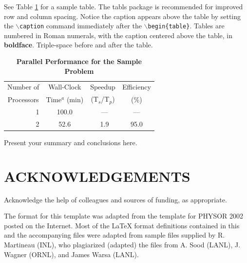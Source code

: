 \documentclass{mc2013}
\begin{document}
See Table \ref{table:example} for a sample table.  The tabls package is
recommended for improved row and column spacing.  Notice the caption appears 
above the table by setting the \texttt{$\backslash$caption} command immediately 
after the \texttt{$\backslash$begin\{table\}}. Tables are numbered in Roman 
numerals, with the caption centered above the table, in {\bf boldface}.  
Triple-space before and after the table.

\vspace{16pt}
\begin{table}[!htb]
\centering
\caption{\bf Parallel Performance for the Sample Problem}
\label{table:example} 
\vspace{14pt}
\begin{tabular}{||r||c|c|c||} \hline \hline
 \multicolumn{1}{||c||}{Number of} &
 \multicolumn{1}{c|}{Wall-Clock} &
 \multicolumn{1}{c|}{Speedup} &
 \multicolumn{1}{c||}{Efficiency} \\
 \multicolumn{1}{||c||}{Processors} &
 \multicolumn{1}{c|}{Time$^{a}$ (min)} &
 \multicolumn{1}{c|}{(T$_{s}$/T$_{p}$)} &
 \multicolumn{1}{c||}{(\%)} \\ \hline\hline
\ 1 &  100.0 & \ ---    & ---  \\ \hline
\ 2 &   52.6 & \ 1.9    & 95.0 \\ \hline \hline
\end{tabular}
\end{table}
\vspace{16pt}



Present your summary and conclusions here.


\section*{ACKNOWLEDGEMENTS}

Acknowledge the help of colleagues and sources of funding, as appropriate.

The format for this template was adapted from the template for PHYSOR 2002 
posted on the Internet.  Most of the {\LaTeX} format definitions contained
in this and the accompanying files were adapted from sample files supplied 
by R. Martineau (INL), who plagiarized (adapted) the files from A. Sood 
(LANL), J. Wagner (ORNL), and James Warsa (LANL).


\setlength{\baselineskip}{12pt}



\end{document}

